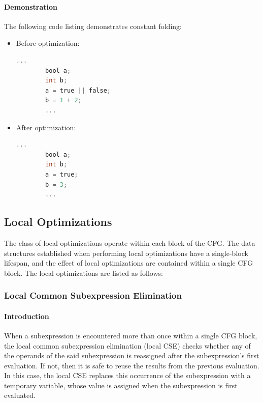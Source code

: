 \paragraph{Demonstration}
The following code listing demonstrates constant folding:

\begin{itemize}
    \item Before optimization:
    \begin{lstlisting}[language=C]
        ...
        bool a;
        int b;
        a = true || false;
        b = 1 + 2;
        ...
    \end{lstlisting}
    \item After optimization:
    \begin{lstlisting}[language=C]
        ...
        bool a;
        int b;
        a = true;
        b = 3;
        ...
    \end{lstlisting}
\end{itemize}

\subsection{Local Optimizations}

The class of local optimizations operate within each block of the CFG. The data structures established when performing local optimizations have a single-block lifespan, and the effect of local optimizations are contained within a single CFG block. The local optimizations are listed as follows:

\subsubsection{Local Common Subexpression Elimination}

\paragraph{Introduction}

When a subexpression is encountered more than once within a single CFG block, the local common subexpression elimination (local CSE) checks whether any of the operands of the said subexpression is reassigned after the subexpression's first evaluation. If not, then it is safe to reuse the results from the previous evaluation. In this case, the local CSE replaces this occurrence of the subexpression with a temporary variable, whose value is assigned when the subexpression is first evaluated.

